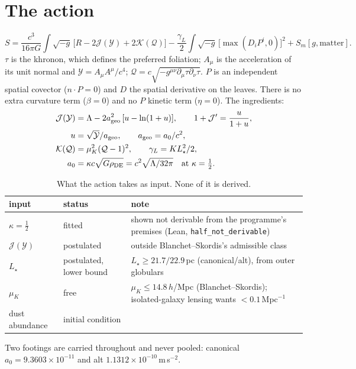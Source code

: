 \documentclass[10pt]{article}
\begin{document}
\section{The action}
\begin{equation}
S=\frac{c^3}{16\pi G}\int\!\sqrt{-g}\,\big[R-2\mathcal J(\mathcal Y)+2\mathcal K(\mathcal Q)\big]
-\frac{\gamma_L}{2}\int\!\sqrt{-g}\,\big[\max(D_iP^i,0)\big]^2+S_m[g,\text{matter}].
\label{eq:S}
\end{equation}
$\tau$ is the khronon, which defines the preferred foliation; $A_\mu$ is the acceleration of its unit normal and $\mathcal Y=A_\mu A^\mu/c^4$; $\mathcal Q=c\sqrt{-g^{\mu\nu}\partial_\mu\tau\partial_\nu\tau}$. $P$ is an independent spatial covector ($n\!\cdot\!P=0$) and $D$ the spatial derivative on the leaves. There is no extra curvature term ($\beta=0$) and no $P$ kinetic term ($\eta=0$). The ingredients:
\begin{align}
\mathcal J(\mathcal Y)&=\Lambda-2a_{\rm geo}^2\,[u-\ln(1+u)],\qquad 1+\mathcal J'=\frac{u}{1+u},\\
u&=\sqrt{\mathcal Y}/a_{\rm geo},\qquad a_{\rm geo}=a_0/c^2,\\
\mathcal K(\mathcal Q)&=\mu_K^2(\mathcal Q-1)^2,\qquad \gamma_L=K L_\star^2/2,\\
a_0&=\kappa c\sqrt{G\rho_{\rm DE}}=c^2\sqrt{\Lambda/32\pi}\quad\text{at }\kappa=\tfrac12 .
\end{align}

\begin{table}[h]\centering\small
\caption{What the action takes as input. None of it is derived.}\label{tab:inputs}
\begin{tabular}{@{}llp{9.2cm}@{}}\toprule
input & status & note\\\midrule
$\kappa=\tfrac12$ & fitted & shown not derivable from the programme's premises (Lean, \texttt{half\_not\_derivable})\\
$\mathcal J(\mathcal Y)$ & postulated & outside Blanchet--Skordis's admissible class\\
$L_\star$ & postulated, lower bound & $L_\star\ge21.7/22.9$\,pc (canonical/alt), from outer globulars\\
$\mu_K$ & free & $\mu_K\le14.8\,h$/Mpc (Blanchet--Skordis); isolated-galaxy lensing wants $<0.1$\,Mpc$^{-1}$\\
dust abundance & initial condition & \\\bottomrule
\end{tabular}
\end{table}
Two footings are carried throughout and never pooled: canonical $a_0=9.3603\times10^{-11}$ and alt $1.1312\times10^{-10}$\,m\,s$^{-2}$.
\end{document}
